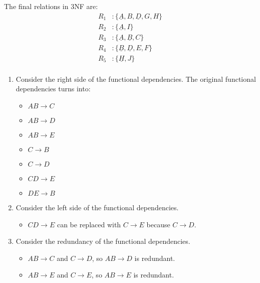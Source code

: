 \documentclass[12pt,letterpaper,titlepage,en-US]{article}
\begin{document}
\begin{homeworkProblem}
    The final relations in 3NF are:
    \begin{align*}
        R_1& : \{\underline{A}, B, \underline{D}, G, H\}\\
        R_2& : \{\underline{A}, I\}\\
        R_3& : \{\underline{A}, \underline{B}, C\}\\
        R_4& : \{\underline{B}, \underline{D}, E, F\}\\
        R_5& : \{\underline{H}, J\}\\
    \end{align*}

\end{homeworkProblem}

\begin{homeworkProblem}
    \begin{enumerate}[label=\textbf{Step {\arabic*}}, leftmargin=2cm]
        \item Consider the right side of the functional dependencies.
            The original functional dependencies turns into:
            \begin{itemize}
                \item $AB \rightarrow C$
                \item $AB \rightarrow D$
                \item $AB \rightarrow E$
                \item $C \rightarrow B$
                \item $C \rightarrow D$
                \item $CD \rightarrow E$
                \item $DE \rightarrow B$
            \end{itemize}
        \item Consider the left side of the functional dependencies.
            \begin{itemize}
                \item $CD \rightarrow E$ can be replaced with $C \rightarrow E$ because $C \rightarrow D$.
            \end{itemize}
        \item Consider the redundancy of the functional dependencies.
            \begin{itemize}
                \item $AB \rightarrow C$ and $C \rightarrow D$, so $AB \rightarrow D$ is redundant.
                \item $AB \rightarrow E$ and $C \rightarrow E$, so $AB \rightarrow E$ is redundant.

\end{itemize}
\end{enumerate}
\end{homeworkProblem}
\end{document}
